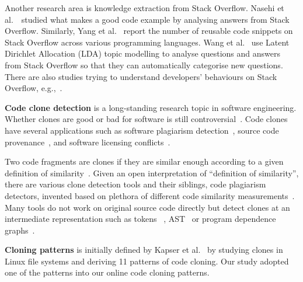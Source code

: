 \documentclass[10pt,journal,compsoc]{IEEEtran}
\begin{document}
Another research area is knowledge extraction from Stack
Overflow. Nasehi et al.~\cite{Nasehi2012}~studied what makes a good
code example by analysing answers from Stack Overflow. Similarly, Yang
et al.~\cite{Yang2016} report the number of reusable code snippets on
Stack Overflow across various programming languages. Wang et
al.~\cite{Wang2013_StackOverflow} use Latent Dirichlet Allocation
(LDA) topic modelling to analyse questions and answers from Stack
Overflow so that they can automatically categorise new
questions. There are also studies trying to understand developers'
behaviours on Stack Overflow,
e.g.,~\cite{Movshovitz-Attias2013,Rosen2016,Choetkiertikul2015,Bosu2013}.

\textbf{Code clone detection} is a long-standing research topic in
software engineering. Whether clones are good or bad for software is
still
controversial~\cite{Sajnani2016,Kapser2003,Kapser2008,Krinke2008,Hotta2010,Gode2011,Harder2013}.
Code clones have several
applications such as software plagiarism
detection~\cite{Prechelt2002}, source code
provenance~\cite{Davies2013}, and software licensing
conflicts~\cite{German2009}.

Two code fragments are clones if they are similar enough according to
a given definition of similarity~\cite{Bellon2007}. Given an open
interpretation of ``definition of similarity'', there are various
clone detection tools and their siblings, code plagiarism detectors,
invented based on plethora of different code similarity
measurements~\cite{Roy2008, Ragkhitwetsagul2016,emse,Svajlenko2014}. 
Many tools do not work on original source code directly but detect clones
at an intermediate representation such as tokens ~\cite{Sajnani2016,Kamiya2002,Li2006,Gode2009,Burrows2007, Smith2009, Duric2012, Prechelt2002, Schleimer2003}, AST~\cite{Baxter1998,Jiang2007a} or program dependence
graphs~\cite{Krinke2001,Komondoor2001}. 

\textbf{Cloning patterns} is initially defined 
by Kapser et al.~\cite{Kapser2003,Kapser2008} by studying clones in 
Linux file systems and deriving 11 patterns of code cloning. 
Our study adopted one of the patterns into our online code cloning patterns.
\end{document}
